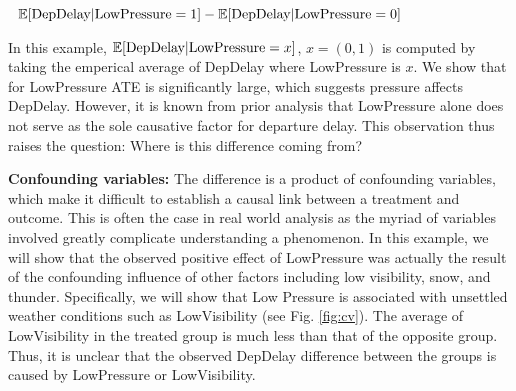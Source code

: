 
\vspace*{0.2cm}
{\small \centering $ \ \ \mathbb{E}[ \text{DepDelay} | \text{LowPressure}=1] - \mathbb{E}[ \text{DepDelay} | \text{LowPressure}=0] $ }
\vspace*{0cm}

In this example, $\mathbb{E}[ \text{DepDelay} | \text{LowPressure}=x ]$, $x=(0,1)$ is computed by taking the emperical average of DepDelay where LowPressure is $x$.  We show that for LowPressure ATE is significantly large, which suggests pressure affects DepDelay. However, it is known from prior analysis that LowPressure alone does not serve as the sole causative factor for departure delay. This observation thus raises the question: Where is this difference coming from?


{\bf Confounding variables:} The difference is a product of confounding variables, which make it difficult to establish a causal link between a treatment and outcome. This is often the case in real world analysis as the myriad of variables involved greatly complicate understanding a phenomenon. In this example, we will show that the observed positive effect of LowPressure was actually the result of the confounding influence of other factors including low visibility, snow, and thunder. Specifically, we will show that Low Pressure is  associated with unsettled weather conditions such as LowVisibility (see Fig. \ref{fig:cv}). The average of LowVisibility in the treated group is much less than that of the opposite group. Thus, it is unclear that the observed DepDelay difference between the groups is caused by LowPressure or LowVisibility.

